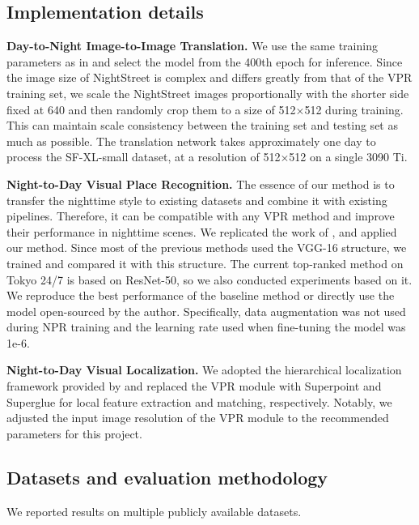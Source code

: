 \documentclass[10pt,twocolumn,letterpaper]{article}
\begin{document}
\subsection{Implementation details}

\noindent \textbf{Day-to-Night Image-to-Image Translation.} We use the same training parameters as in \cite{negcut} and select the model from the 400th epoch for inference. Since the image size of NightStreet is complex and differs greatly from that of the VPR training set, we scale the NightStreet images proportionally with the shorter side fixed at 640 and then randomly crop them to a size of 512$\times$512 during training. This can maintain scale consistency between the training set and testing set as much as possible. The translation network takes approximately one day to process the SF-XL-small dataset, at a resolution of 512$\times$512 on a single 3090 Ti.

\noindent \textbf{Night-to-Day Visual Place Recognition.} The essence of our method is to transfer the nighttime style to existing datasets and combine it with existing pipelines. Therefore, it can be compatible with any VPR method and improve their performance in nighttime scenes. We replicated the work of \cite{netvlad, dvg, cosplace}, and applied our method. Since most of the previous methods used the VGG-16 structure, we trained and compared it with this structure. The current top-ranked method on Tokyo 24/7 is based on ResNet-50, so we also conducted experiments based on it. We reproduce the best performance of the baseline method or directly use the model open-sourced by the author. Specifically, data augmentation was not used during NPR training and the learning rate used when fine-tuning the model was 1e-6.

\noindent \textbf{Night-to-Day Visual Localization.} We adopted the hierarchical localization framework provided by \cite{hloc} and replaced the VPR module with Superpoint \cite{superpoint} and Superglue \cite{superglue} for local feature extraction and matching, respectively. Notably, we adjusted the input image resolution of the VPR module to the recommended parameters for this project.


\subsection{Datasets and evaluation methodology}

We reported results on multiple publicly available datasets.
\end{document}

